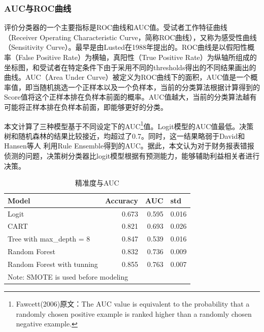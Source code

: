 \documentclass{article}
\begin{document}
\subsubsection{AUC与ROC曲线}
\par 评价分类器的一个主要指标是ROC曲线和AUC值。受试者工作特征曲线 （Receiver Operating Characteristic Curve，简称ROC曲线），又称为感受性曲线（Sensitivity Curve）。最早是由Lusted\cite{Goodenough1974Radiographic}在1988年提出的。ROC曲线是以假阳性概率（False Positive Rate）为横轴，真阳性（True Positive Rate）为纵轴所组成的坐标图，和受试者在特定条件下由于采用不同的thresholds得出的不同结果画出的曲线。AUC（Area Under Curve）被定义为ROC曲线下的面积，AUC值是一个概率值\cite{Fawcett2006ROC}，即当随机挑选一个正样本以及一个负样本，当前的分类算法根据计算得到的Score值将这个正样本排在负样本前面的概率。AUC值越大，当前的分类算法越有可能将正样本排在负样本前面，即能够更好的分类。
\par 本文计算了三种模型基于不同设定下的AUC\footnote{Fawcett(2006)原文：The AUC value is equivalent to the probability that a randomly chosen positive example is ranked higher than a randomly chosen negative example.}值。Logit模型的AUC值最低。决策树和随机森林的结果比较接近，均超过了0.7。同时，这一结果略弱于David和Hansen等人\cite{} 利用Rule Ensemble得到的AUC。据此，本文认为对于财务报表错报侦测的问题，决策树分类器比logit模型根据有预测能力，能够辅助利益相关者进行决策。
\begin{table}[htbp]
  \centering
  \caption{精准度与AUC}
    \begin{tabular}{llll} \hline\hline
    Model & Accuracy & AUC   & std \\ \hline
    Logit & \multicolumn{1}{r}{0.673} & \multicolumn{1}{r}{0.595} & \multicolumn{1}{r}{0.016} \\
    CART  & \multicolumn{1}{r}{0.821} & \multicolumn{1}{r}{0.693} & \multicolumn{1}{r}{0.026} \\
    Tree with max\_depth = 8 & \multicolumn{1}{r}{0.847} & \multicolumn{1}{r}{0.539} & \multicolumn{1}{r}{0.016} \\
    Random Forest & \multicolumn{1}{r}{0.832} & \multicolumn{1}{r}{0.736} & \multicolumn{1}{r}{0.009} \\
    Random Forest with tunning & \multicolumn{1}{r}{0.855} & \multicolumn{1}{r}{0.763} & \multicolumn{1}{r}{0.007} \\ \hline
    \multicolumn{4}{l}{Note: SMOTE is used before modeling} \\ \hline\hline
    \end{tabular}%
  \label{tab:accauc}%
\end{table}%
\end{document}

